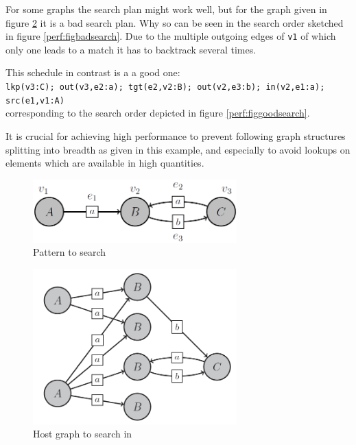 For some graphs the search plan might work well, but for the graph given in figure \ref{perf:figgraphtosearchin} it is a bad search plan.
Why so can be seen in the search order sketched in figure \ref{perf:figbadsearch}.
Due to the multiple outgoing edges of \texttt{v1} of which only one leads to a match it has to backtrack several times.

This schedule in contrast is a a good one:\\
\texttt{lkp(v3:C); out(v3,e2:a); tgt(e2,v2:B); out(v2,e3:b); in(v2,e1:a); src(e1,v1:A)}\\
corresponding to the search order depicted in figure \ref{perf:figgoodsearch}.

It is crucial for achieving high performance to prevent following graph structures splitting into breadth as given in this example, and especially to avoid lookups on elements which are available in high quantities.

\begin{figure}[p]
  \centering
  \includegraphics[width=0.7\textwidth]{fig/Pattern}
  \caption{Pattern to search}
  \label{perf:figpatterntosearch}
\end{figure}

\begin{figure}[p]
  \centering
  \includegraphics[width=0.7\textwidth]{fig/Graph}
  \caption{Host graph to search in}
  \label{perf:figgraphtosearchin}
\end{figure}

\pagebreak

